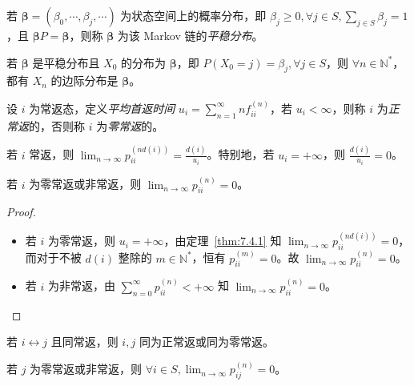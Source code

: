 \documentclass[../main.tex]{subfiles}
\begin{document}
\begin{definition}\label{def:7.4.1}
    若 $\boldsymbol\beta=(\beta_0,\cdots,\beta_j,\cdots)$ 为状态空间上的概率分布，即 $\beta_j\geq0,\forall j\in S,\sum_{j\in S}\beta_j=1$，且 $\boldsymbol\beta P=\boldsymbol\beta$，则称 $\boldsymbol\beta$ 为该 Markov 链的\emph{平稳分布}。
\end{definition}

若 $\boldsymbol\beta$ 是平稳分布且 $X_0$ 的分布为 $\boldsymbol\beta$，即 $P(X_0=j)=\beta_j,\forall j\in S$，则 $\forall n\in\mathbb N^*$，都有 $X_n$ 的边际分布是 $\boldsymbol\beta$。

\begin{definition}\label{def:7.4.2}
    设 $i$ 为常返态，定义\emph{平均首返时间} $u_i=\sum_{n=1}^\infty nf_{ii}^{(n)}$，若 $u_i<\infty$，则称 $i$ 为\emph{正常返}的，否则称 $i$ 为\emph{零常返}的。
\end{definition}

\begin{theorem}\label{thm:7.4.1}
    若 $i$ 常返，则 $\lim_{n\rightarrow\infty}p_{ii}^{(nd(i))}=\frac{d(i)}{u_i}$。特别地，若 $u_i=+\infty$，则 $\frac{d(i)}{u_i}=0$。
\end{theorem}

\begin{theorem}\label{thm:7.4.2}
    若 $i$ 为零常返或非常返，则 $\lim_{n\rightarrow\infty}p_{ii}^{(n)}=0$。
\end{theorem}

\begin{proof}
    \mbox{}
    \begin{itemize}
        \item 若 $i$ 为零常返，则 $u_i=+\infty$，由定理~\ref{thm:7.4.1} 知 $\lim_{n\rightarrow\infty}p_{ii}^{(nd(i))}=0$，而对于不被 $d(i)$ 整除的 $m\in\mathbb N^*$，恒有 $p_{ii}^{(m)}=0$。故 $\lim_{n\rightarrow\infty}p_{ii}^{(n)}=0$。
        \item 若 $i$ 为非常返，由 $\sum_{n=0}^\infty p_{ii}^{(n)}<+\infty$ 知 $\lim_{n\rightarrow\infty}p_{ii}^{(n)}=0$。
    \end{itemize}
\end{proof}

\begin{theorem}\label{thm:7.4.3}
    若 $i\leftrightarrow j$ 且同常返，则 $i,j$ 同为正常返或同为零常返。
\end{theorem}

\begin{theorem}\label{thm:7.4.4}
    若 $j$ 为零常返或非常返，则 $\forall i\in S,\lim_{n\rightarrow\infty}p_{ij}^{(n)}=0$。
\end{theorem}
\end{document}
